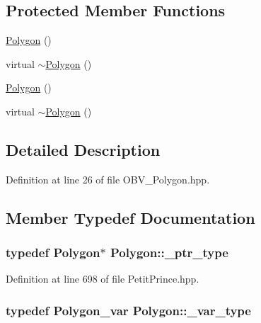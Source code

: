 \subsection*{Protected Member Functions}
\begin{DoxyCompactItemize}
\item 
\hyperlink{class_polygon_ac183e712f8be1e13f1c9d5b4d4512ead}{Polygon} ()
\item 
virtual \hyperlink{class_polygon_a873f9acee059f717277b6414102dab16}{$\sim$\+Polygon} ()
\item 
\hyperlink{class_polygon_ac183e712f8be1e13f1c9d5b4d4512ead}{Polygon} ()
\item 
virtual \hyperlink{class_polygon_a873f9acee059f717277b6414102dab16}{$\sim$\+Polygon} ()
\end{DoxyCompactItemize}


\subsection{Detailed Description}


Definition at line 26 of file O\+B\+V\+\_\+\+Polygon.\+hpp.



\subsection{Member Typedef Documentation}
\subsubsection[{\texorpdfstring{\+\_\+ptr\+\_\+type}{_ptr_type}}]{\setlength{\rightskip}{0pt plus 5cm}typedef {\bf Polygon}$\ast$ {\bf Polygon\+::\+\_\+ptr\+\_\+type}}\hypertarget{class_polygon_aeef4c9b11b0fb5fcb4c33aa181da7791}{}\label{class_polygon_aeef4c9b11b0fb5fcb4c33aa181da7791}


Definition at line 698 of file Petit\+Prince.\+hpp.

\subsubsection[{\texorpdfstring{\+\_\+var\+\_\+type}{_var_type}}]{\setlength{\rightskip}{0pt plus 5cm}typedef {\bf Polygon\+\_\+var} {\bf Polygon\+::\+\_\+var\+\_\+type}}\hypertarget{class_polygon_aae841b2b5d390f037539fc5307bc50f6}{}\label{class_polygon_aae841b2b5d390f037539fc5307bc50f6}


